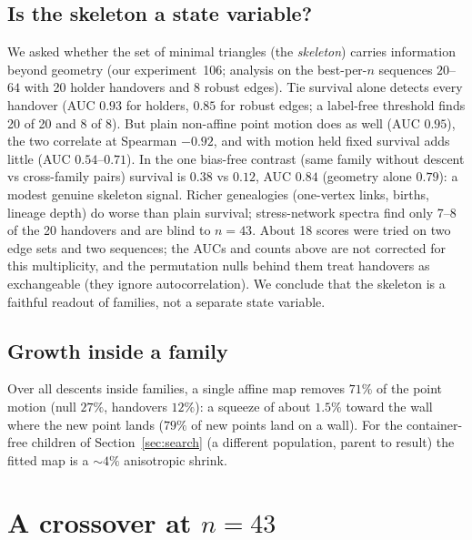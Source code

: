 \documentclass[11pt]{amsart}
\theoremstyle{definition}
\begin{document}
\subsection{Is the skeleton a state variable?}\label{sec:skeleton}
We asked whether the set of minimal triangles (the \emph{skeleton}) carries information beyond geometry (our experiment~106; analysis on the best-per-$n$ sequences $20$--$64$ with 20 holder handovers and 8 robust edges). Tie survival alone detects every handover (AUC $0.93$ for holders, $0.85$ for robust edges; a label-free threshold finds 20 of 20 and 8 of 8). But plain non-affine point motion does as well (AUC $0.95$), the two correlate at Spearman $-0.92$, and with motion held fixed survival adds little (AUC $0.54$--$0.71$). In the one bias-free contrast (same family without descent vs cross-family pairs) survival is $0.38$ vs $0.12$, AUC $0.84$ (geometry alone $0.79$): a modest genuine skeleton signal. %
Richer genealogies (one-vertex links, births, lineage depth) do worse than plain survival; stress-network spectra find only 7--8 of the 20 handovers and are blind to $n = 43$. About 18 scores were tried on two edge sets and two sequences; the AUCs and counts above are not corrected for this multiplicity, and the permutation nulls behind them treat handovers as exchangeable (they ignore autocorrelation). We conclude that the skeleton is a faithful readout of families, not a separate state variable. %

\subsection{Growth inside a family}
Over all descents inside families, a single affine map removes $71\%$ of the point motion (null $27\%$, handovers $12\%$): a squeeze of about $1.5\%$ toward the wall where the new point lands ($79\%$ of new points land on a wall). For the container-free children of Section~\ref{sec:search} (a different population, parent to result) the fitted map is a $\sim4\%$ anisotropic shrink. %

\section{A crossover at \texorpdfstring{$n = 43$}{n = 43}}\label{sec:43}
\end{document}
